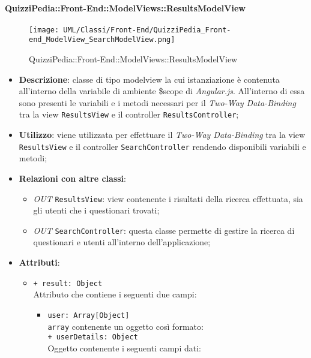 \paragraph{QuizziPedia::Front-End::ModelViews::ResultsModelView}
	
	\label{QuizziPedia::Front-End::ModelViews::ResultsModelView}
	
	\begin{figure}[ht]
		\centering
		\texttt{[image: UML/Classi/Front-End/QuizziPedia\_Front-end\_ModelView\_SearchModelView.png]}
		\caption{QuizziPedia::Front-End::ModelViews::ResultsModelView}
	\end{figure} \FloatBarrier
	
	\begin{itemize}
		\item \textbf{Descrizione}: classe di tipo modelview la cui istanziazione è contenuta all'interno della variabile di ambiente \$scope di \textit{Angular.js}. All'interno di essa sono presenti le variabili e i metodi necessari per il \textit{Two-Way Data-Binding} tra la view \texttt{ResultsView} e il controller \texttt{ResultsController};
		\item \textbf{Utilizzo}: viene utilizzata per effettuare il \textit{Two-Way Data-Binding} tra la view \texttt{ResultsView} e il controller \texttt{SearchController} rendendo disponibili variabili e metodi;
		\item \textbf{Relazioni con altre classi}: 
		\begin{itemize}
			\item \textit{OUT} \texttt{ResultsView}: view contenente i risultati della ricerca effettuata, sia gli utenti che i questionari trovati; 
			\item \textit{OUT} \texttt{SearchController}: questa classe permette di gestire la ricerca di questionari e utenti all’interno dell’applicazione;
		\end{itemize}
		\item \textbf{Attributi}: 
		\begin{itemize}
			\item \texttt{+ result: Object} \\ Attributo che contiene i seguenti due campi: 
			\begin{itemize}
				\item \texttt{user: Array[Object]}\\ \texttt{array} contenente un oggetto così formato:\\
				\texttt{+ userDetails: Object} \\ Oggetto contenente i seguenti campi dati:

\end{itemize}
\end{itemize}
\end{itemize}
